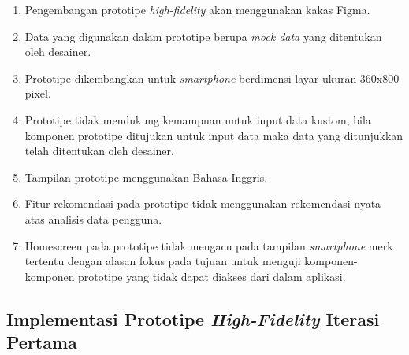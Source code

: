 \begin{enumerate}
  \item Pengembangan prototipe \textit{high-fidelity} akan menggunakan kakas Figma.
  \item Data yang digunakan dalam prototipe berupa \textit{mock data} yang ditentukan oleh desainer.
  \item Prototipe dikembangkan untuk \textit{smartphone} berdimensi layar ukuran 360x800 pixel.
  \item Prototipe tidak mendukung kemampuan untuk input data kustom, bila komponen prototipe ditujukan untuk input data maka data yang ditunjukkan telah ditentukan oleh desainer.
  \item Tampilan prototipe menggunakan Bahasa Inggris. 
  \item Fitur rekomendasi pada prototipe tidak menggunakan rekomendasi nyata atas analisis data pengguna.
  \item Homescreen pada prototipe tidak mengacu pada tampilan \textit{smartphone} merk tertentu dengan alasan fokus pada tujuan untuk menguji komponen-komponen prototipe yang tidak dapat diakses dari dalam aplikasi.
\end{enumerate}

\subsection{Implementasi Prototipe \textit{High-Fidelity} Iterasi Pertama}
\label{subsec:hifi_1_implementasi}


  
